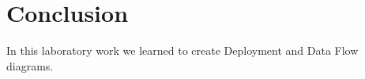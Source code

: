 \documentclass[12pt,a4paper,titlepage]{article}
\begin{document}
\section{Conclusion}
In this laboratory work we learned to create Deployment and Data Flow diagrams.

\clearpage
\cleardoublepage
\end{document}
